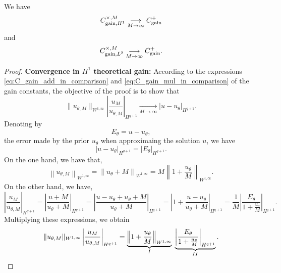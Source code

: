 \begin{theorem}\label{thm:comparison_add_mul}
	We have
	\begin{equation}\label{eq:convCH1}
        C_{\text{\rm gain},H^1}^{\times,M}
		\underset{M\rightarrow\infty}{\longrightarrow}
		C^{+}_{\text{\rm gain}}
	\end{equation}
	and
	\begin{equation*}\label{eq:convCL2}
		C_{\text{\rm gain},L^2}^{\times,M}
		\underset{M\rightarrow\infty}{\longrightarrow}
		C^{+}_{\text{\rm gain}}.
	\end{equation*}
\end{theorem}


\begin{proof}
\textbf{Convergence in $H^1$ theoretical gain:}
	According to the expressions \eqref{eq:C_gain_add_in_comparison} and \eqref{eq:C_gain_mul_in_comparison}
	of the gain constants, the objective of the proof is to show that
	\begin{equation*}
		\|u_{\theta,M}\|_{W^{1,\infty}} \left|\frac{u_M}{u_{\theta,M}}\right|_{H^{q+1}} \underset{M\rightarrow\infty}{\longrightarrow} |u-u_\theta|_{H^{q+1}}.
	\end{equation*}
	Denoting by
	\begin{equation*}
		\label{eq:prior_error_approximation}
		E_\theta=u - u_{\theta},
	\end{equation*}
	the error made by the prior $u_{\theta}$
	when approximaing the solution $u$, we have
	\begin{equation*}
		|u-u_\theta|_{H^{q+1}} = |E_\theta|_{H^{q+1}}.
	\end{equation*}
	On the one hand, we have that,
	\begin{equation*}
		\left\|u_{\theta,M}\right\|_{W^{1,\infty}}
		=
		\left\|u_\theta + M \right\|_{W^{1,\infty}}
		=
		M
		\left\|1 + \frac {u_\theta} M \right\|_{W^{1,\infty}}.
	\end{equation*}
	On the other hand, we have,
	\begin{equation*}
		\left|\frac{u_M}{u_{\theta,M}}\right|_{H^{q+1}}
		=
		\left|\frac{u + M}{u_\theta + M}\right|_{H^{q+1}}
		=
		\left|\frac{u - u_\theta + u_\theta + M}{u_\theta + M}\right|_{H^{q+1}}
		=
		\left|1 + \frac{u - u_\theta}{u_\theta + M}\right|_{H^{q+1}}
		=
		\dfrac{1}{M}\left| \frac{E_\theta}{1 + \frac {u_\theta} M}\right|_{H^{q+1}}.
	\end{equation*}
	Multiplying these expressions, we obtain
	\begin{equation}
		\label{eq:error_mul_q2}
		\|u_{\theta,M}\|_{W^{1,\infty}} \left|\frac{u_M}{u_{\theta,M}}\right|_{H^{q+1}}= \underbrace{\left\|1+\frac{u_\theta}{M}\right\|_{W^{1,\infty}}}_{\MakeUppercase{\romannumeral 1}} \;
		\underbrace{\left|\frac{E_\theta}{1+\frac{u_\theta}{M}}\right|_{H^{q+1}}}_{\MakeUppercase{\romannumeral 2}}.
	\end{equation}


\end{proof}
